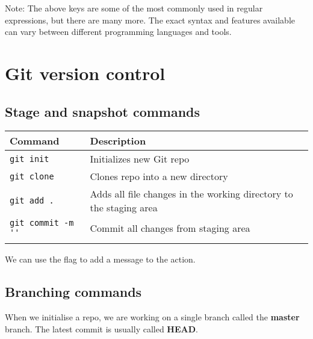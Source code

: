 \documentclass{article}
\begin{document}
Note: The above keys are some of the most commonly used in regular expressions, but there are many more. The exact syntax and features available can vary between different programming languages and tools.
\newpage
\section{Git version control}
\subsection{Stage and snapshot commands}
\begin{table}[H]
      \begin{tabular}{ll}
            \textbf{Command}             & \textbf{Description}                                               \\ \hline
            \lstinline|git init|         & Initializes new Git repo                                           \\ \arrayrulecolor{lightgray}\hline
            \lstinline|git clone|        & Clones repo into a new directory                                   \\ \arrayrulecolor{lightgray}\hline
            \lstinline|git add . |       & Adds all file changes in the working directory to the staging area \\ \arrayrulecolor{lightgray}\hline
            \lstinline|git commit -m ''| & Commit all changes from staging area                               \\ \arrayrulecolor{lightgray}\hline
      \end{tabular}
\end{table}
We can use the  flag to add a message to the action.
\subsection{Branching commands}
When we initialise a repo, we are working on a single branch called the \textbf{master} branch. The latest commit is usually called \textbf{HEAD}.
\end{document}
